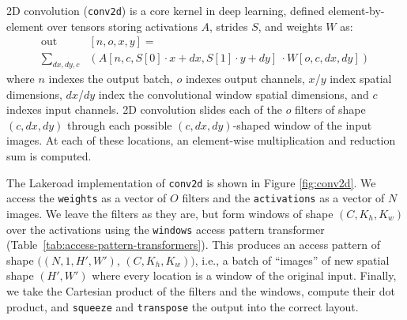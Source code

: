 \documentclass[prologue, dvipsnames, sigplan, screen, review, anonymous]{acmart}
\newcommand{\g}{Lakeroad\xspace}
\newcommand{\accesspatternshape}[2]{$($$\left( #1 \right)$, $\left( #2 \right)$$)$}
\newcommand{\ctd}{\texttt{conv2d}\xspace}
\begin{document}
2D convolution (\ctd{})
  is a core kernel
  in deep learning,
  defined element-by-element %
  over tensors storing
  activations $A$,
  strides $S$, and
  weights $W$ as: 
\begin{equation*}%
\begin{split}
\mbox{out}&[n, o, x, y] =\\
\sum_{dx, dy, c}&
    (A[n, c, S[0] \cdot x  + dx, S[1] \cdot y + dy] \
    \cdot W[o, c, dx, dy])
\end{split}
\end{equation*}
where
  $n$ indexes the output batch,
  $o$ indexes output channels,
  $x$/$y$ index spatial dimensions,
  $dx$/$dy$ index
    the convolutional window spatial dimensions,
  and $c$ indexes input channels.
2D convolution
  slides each of the $o$
  filters
  of shape $(c, dx, dy)$
  through each possible
  $(c, dx, dy)$-shaped window
  of the input images.
At each of these locations,
  an element-wise multiplication
  and reduction sum
  is computed.

The \g implementation
  of \ctd{}
  is shown in 
  Figure \ref{fig:conv2d}.
We access
  the \texttt{weights}
  as a vector of $O$ filters
  and the \texttt{activations}
  as a vector of $N$ images.
We leave the filters as they are,
  but form windows
  of shape
  $(C, K_h, K_w)$
  over the activations
  using the \texttt{windows}
  access pattern transformer
  (Table~\ref{tab:access-pattern-transformers}).
This produces an access pattern
  of shape
  \accesspatternshape
  {N, 1, H', W'}
  {C, K_h, K_w},
  i.e.,
  a batch of ``images''
  of new spatial shape
  $(H', W')$
  where every location
  is a window of
  the original input.
Finally,
  we take the Cartesian product
  of the filters
  and the windows,
  compute their dot product,
  and \texttt{squeeze} and \texttt{transpose}
  the output
  into the correct layout.
  
\end{document}
